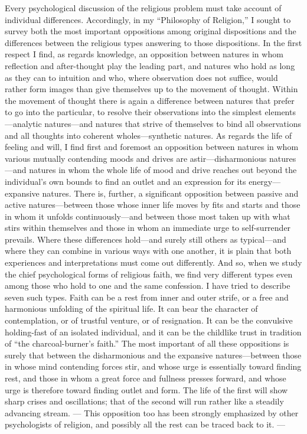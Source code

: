 \documentclass[12pt,a4paper]{article}
\newcommand{\opage}[1]{\marginnote{\footnotesize\textit{[#1]}}}
\begin{document}
Every psychological discussion of the religious problem must take account of
individual differences. Accordingly, in my ``Philosophy of Religion,'' I sought to
survey both the \opage{50}most important oppositions among original dispositions and the
differences between the religious types answering to those dispositions. In the first
respect I find, as regards knowledge, an opposition between natures in whom reflection
and after-thought play the leading part, and natures who hold as long as they can to
intuition and who, where observation does not suffice, would rather form images than
give themselves up to the movement of thought. Within the movement of thought there
is again a difference between natures that prefer to go into the particular, to
resolve their observations into the simplest elements---analytic natures---and natures
that strive of themselves to bind all observations and all thoughts into coherent
wholes---synthetic natures. As regards the life of feeling and will, I find first and
foremost an opposition between natures in whom various mutually contending moods and
drives are astir---disharmonious natures---and natures in whom the whole life of mood
and drive reaches out beyond the individual's own bounds to find an outlet and an
expression for its energy---expansive natures. There is, further, a significant
opposition between passive and active natures---between those whose inner life moves
by fits and starts and those in whom it unfolds continuously---and between those most
taken up with what stirs within themselves and those in whom an immediate urge to
self-surrender prevails. Where these differences hold---and surely still others as
typical---and where they can combine in various ways with one another, it is plain
that both experiences and interpretations must come out differently. And so, when we
study the chief psychological forms of religious faith, we find very different types
even among those who hold to one and the same confession. I have tried to describe
seven such types. Faith can be a rest from inner and outer strife, or a free and
harmonious unfolding of the spiritual life. It can \opage{51}bear the character of
contemplation, or of trustful venture, or of resignation. It can be the convulsive
holding-fast of an isolated individual, and it can be the childlike trust in tradition
of ``the charcoal-burner's faith.'' The most important of all these oppositions is
surely that between the disharmonious and the expansive natures---between those in
whose mind contending forces stir, and whose urge is essentially toward finding rest,
and those in whom a great force and fullness presses forward, and whose urge is
therefore toward finding outlet and form. The life of the first will show sharp crises
and oscillations; that of the second will run rather like a steadily advancing
stream. --- This opposition too has been strongly emphasized by other psychologists of
religion, and possibly all the rest can be traced back to it. ---
\end{document}
